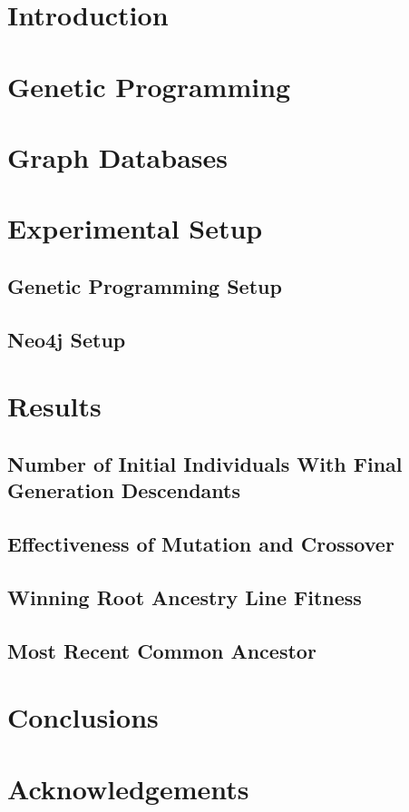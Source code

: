 \documentclass{sig-alternate}
\begin{document}
\category{}{}{}
\terms{}

\section{Introduction} \label{Introduction}

\section{Genetic Programming} \label{Genetic Programming}

\section{Graph Databases} \label{Graph Databases}

\section{Experimental Setup} \label{Experiments}

\subsection{Genetic Programming Setup} \label{Genetic Programming Setup}

\subsection{Neo4j Setup} \label{Neo4j Setup}

\section{Results} \label{Results}

\subsection{Number of Initial Individuals With Final Generation Descendants} \label{Number Initial Individuals 
With Descendants}

\subsection{Effectiveness of Mutation and Crossover} \label{Effectiveness Mutation Crossover}

\subsection{Winning Root Ancestry Line Fitness} \label{Winning Root Line Fitness}

\subsection{Most Recent Common Ancestor} \label{Most Recent Common Ancestor}

\section{Conclusions} \label{Conclusions}

\section*{Acknowledgements}

\pagebreak



\end{document}
